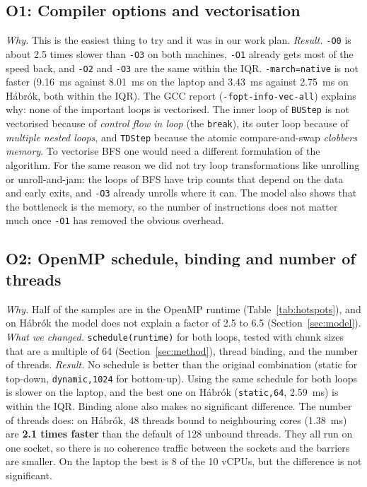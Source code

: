 \subsection{O1: Compiler options and vectorisation}
\emph{Why.} This is the easiest thing to try and it was in our work plan. \emph{Result.}
\texttt{-O0} is about 2.5 times slower than \texttt{-O3} on both machines, \texttt{-O1} already
gets most of the speed back, and \texttt{-O2} and \texttt{-O3} are the same within the IQR.
\texttt{-march=native} is not faster (\SI{9.16}{ms} against \SI{8.01}{ms} on the laptop and
\SI{3.43}{ms} against \SI{2.75}{ms} on Hábrók, both within the IQR). The GCC report
(\texttt{-fopt-info-vec-all}) explains why: none of the important loops is vectorised. The
inner loop of \texttt{BUStep} is not vectorised because of \emph{control flow in loop} (the
\texttt{break}), its outer loop because of \emph{multiple nested loops}, and \texttt{TDStep}
because the atomic compare-and-swap \emph{clobbers memory}. To vectorise BFS one would need a
different formulation of the algorithm. For the same reason we did not try loop
transformations like unrolling or unroll-and-jam: the loops of BFS have trip counts that
depend on the data and early exits, and \texttt{-O3} already unrolls where it can. The model
also shows that the bottleneck is the memory, so the number of instructions does not matter
much once \texttt{-O1} has removed the obvious overhead.

\subsection{O2: OpenMP schedule, binding and number of threads}
\emph{Why.} Half of the samples are in the OpenMP runtime (Table~\ref{tab:hotspots}), and on
Hábrók the model does not explain a factor of 2.5 to 6.5 (Section~\ref{sec:model}).
\emph{What we changed.} \texttt{schedule(runtime)} for both loops, tested with chunk sizes
that are a multiple of 64 (Section~\ref{sec:method}), thread binding, and the number of
threads. \emph{Result.} No schedule is better than the original combination (static for
top-down, \texttt{dynamic,1024} for bottom-up). Using the same schedule for both loops is
slower on the laptop, and the best one on Hábrók (\texttt{static,64}, \SI{2.59}{ms}) is
within the IQR. Binding alone also makes no significant difference. The number of threads
does: on Hábrók, 48 threads bound to neighbouring cores (\SI{1.38}{ms}) are \textbf{2.1 times
faster} than the default of 128 unbound threads. They all run on one socket, so there is no
coherence traffic between the sockets and the barriers are smaller. On the laptop the best is
8 of the 10 vCPUs, but the difference is not significant.

